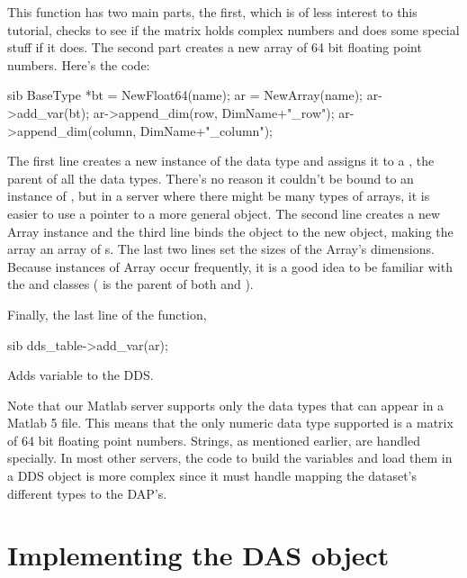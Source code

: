 \documentclass{dods-paper}
\begin{document}
This function has two main parts, the first, which is of less interest
to this tutorial, checks to see if the matrix holds complex numbers
and does some special stuff if it does. The second part creates a new
array of 64 bit floating point numbers. Here's the code:

  
\begin{vcode}{sib}
   BaseType *bt = NewFloat64(name);   
   ar = NewArray(name);
   ar->add_var(bt);
   ar->append_dim(row, DimName+"_row");
   ar->append_dim(column, DimName+"_column");
\end{vcode}
 

The first line creates a new instance of the  data type and
assigns it to a , the parent of all the data types. There's no
reason it couldn't be bound to an instance of , but in a server
where there might be many types of arrays, it is easier to use a pointer to a
more general object.  The second line creates a new Array instance and the
third line binds the  object to the new  object,
making the array an array of s. The last two lines set the sizes
of the Array's dimensions.  Because instances of Array occur frequently, it
is a good idea to be familiar with the 
and 
classes ( is the parent of both  and ).

Finally, the last line of the function,

\begin{vcode}{sib}
    dds_table->add_var(ar);
\end{vcode}

Adds variable  to the DDS.

Note that our Matlab server supports only the data types that can appear
in a Matlab 5 file. This means that the only numeric data type supported
is a matrix of 64 bit floating point numbers. Strings, as mentioned earlier,
are handled specially. In most other servers, the code to build the variables
and load them in a DDS object is more complex since it must handle mapping
the dataset's different types to the DAP's.

\section{Implementing the DAS object}
\end{document}
